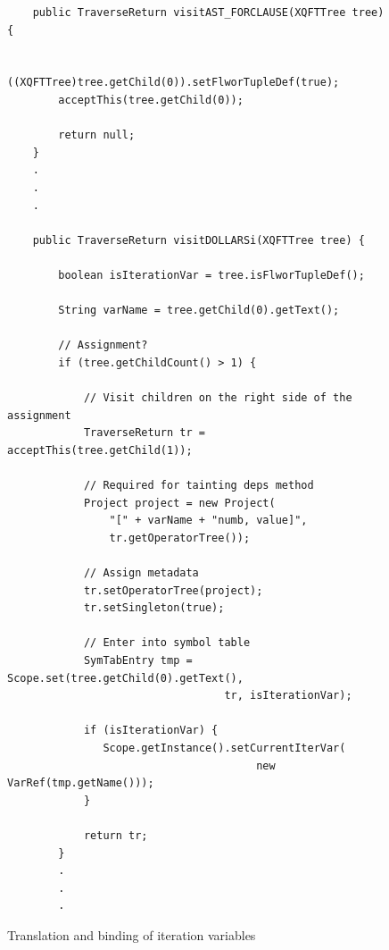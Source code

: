 \begin{figure}[!htp]
\begin{center}
\lstset{language=Java,numbers=left}
\begin{lstlisting}
    public TraverseReturn visitAST_FORCLAUSE(XQFTTree tree) {
        
        ((XQFTTree)tree.getChild(0)).setFlworTupleDef(true);
        acceptThis(tree.getChild(0));

        return null;
    }
    .
    .
    .
    
    public TraverseReturn visitDOLLARSi(XQFTTree tree) {
        
        boolean isIterationVar = tree.isFlworTupleDef();
        
        String varName = tree.getChild(0).getText();
        
        // Assignment?
        if (tree.getChildCount() > 1) {
            
            // Visit children on the right side of the assignment
            TraverseReturn tr = acceptThis(tree.getChild(1));
            
            // Required for tainting deps method
            Project project = new Project(
                "[" + varName + "numb, value]", 
                tr.getOperatorTree());

            // Assign metadata
            tr.setOperatorTree(project);
            tr.setSingleton(true);
            
            // Enter into symbol table
            SymTabEntry tmp = Scope.set(tree.getChild(0).getText(), 
                                  tr, isIterationVar);
            
            if (isIterationVar) {
               Scope.getInstance().setCurrentIterVar(
                                       new VarRef(tmp.getName()));
            }
            
            return tr;
        }
        .
        .
        .
\end{lstlisting}
  \caption{Translation and binding of iteration variables}
  \label{fig:impl:td:varbindfor}
\end{center}
\end{figure}


